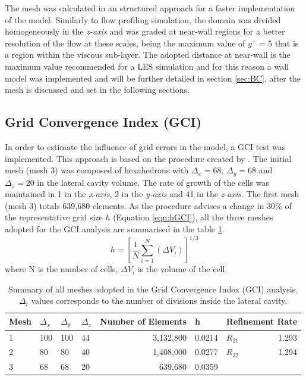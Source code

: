 \begin{refsection}
The mesh was calculated in an structured approach for a faster implementation of the model.  Similarly to flow profiling simulation, the domain was divided homogeneously in the \textit{z-axis} and was graded at near-wall regions for a better resolution of the flow at these scales, being the maximum value of $y^{+}=5$ that is a region within the viscous sub-layer. The adopted distance at near-wall is the maximum value recommended for a LES simulation and for this reason a wall model was implemented and will be further detailed in section \ref{sec:BC}, after the mesh is discussed and set in the following sections.

\subsection{Grid Convergence Index (GCI)}
In order to estimate the influence of grid errors in the model, a GCI test was implemented. This approach is based on the procedure created by \textcite{celik2008}. The initial mesh (mesh 3) was composed of hexahedrons with $\Delta_x =68$, $\Delta_y = 68$ and $\Delta_z = 20$ in the lateral cavity volume. The rate of growth of the cells was maintained in 1 in the \textit{x-axis}, 2 in the \textit{y-axis} and 41 in the \textit{z-axis}. The first mesh (mesh 3) totals 639,680 elements. As the procedure advises a change in 30\% of the representative grid size $h$ (Equation \ref{eqn:hGCI}),  all the three meshes adopted for the GCI analysis are summarised in the table \ref{tab:gci}.
\begin{equation}
h=\left [\frac{1}{N}\sum_{i=1}^{N}(\Delta V  _i)\right ]^{1/3}
\label{eqn:hGCI}
\end{equation}
where N is the number of cells, $\Delta V_i$ is the volume of the cell.

\begin{table}[]
\centering
\caption{Summary of all meshes adopted in the Grid Convergence Index (GCI) analysis. $\Delta_i$ values corresponds to the number of divisions inside the lateral cavity.}
\label{tab:gci}
\begin{tabular}{llllrrlr}
Mesh & $\Delta_x$ & $\Delta_y$ & $\Delta_z$ & \multicolumn{1}{l}{Number of Elements} & \multicolumn{1}{l}{h} & \multicolumn{2}{l}{Refinement Rate} \\ \hline
1    & 100        & 100     & 44         & 3,132,800                              & 0.0214                & $R_{21}$   & 1.293                  \\
2    & 80         & 80         & 40         & 1,408,000                              & 0.0277                & $R_{32}$   & 1.294                  \\
3    & 68         & 68         & 20         & 639,680                                & 0.0359                &            & \multicolumn{1}{l}{}  
\end{tabular}
\end{table}


\end{refsection}
